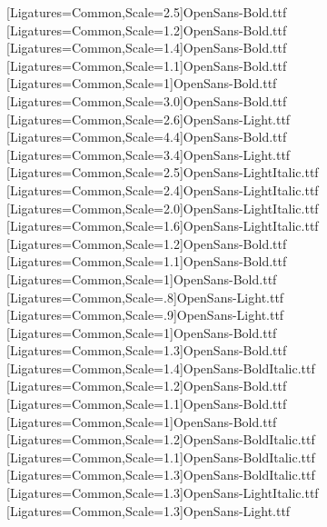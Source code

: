 \setsansfont[Ligatures=Common,Scale=1,SlantedFont={OpenSans-LightItalic.ttf},BoldFont={OpenSans-Bold.ttf},BoldSlantedFont={OpenSans-BoldItalic.ttf}]{OpenSans-Light.ttf} %
\newfontface{\sfbHugeRomeo}[Ligatures=Common,Scale=2.5]{OpenSans-Bold.ttf}
\newfontface{\cmssbxparttocRomeo}[Ligatures=Common,Scale=1.2]{OpenSans-Bold.ttf}
\newfontface{\cmssbxsectionRomeo}[Ligatures=Common,Scale=1.4]{OpenSans-Bold.ttf}
\newfontface{\cmssbxelevenRomeo}[Ligatures=Common,Scale=1.1]{OpenSans-Bold.ttf}
\newfontface{\cmssbxchaptocRomeo}[Ligatures=Common,Scale=1]{OpenSans-Bold.ttf}
\newfontface{\cmssbxchaptitleRomeo}[Ligatures=Common,Scale=3.0]{OpenSans-Bold.ttf}
\newfontface{\cmsschapnameRomeo}[Ligatures=Common,Scale=2.6]{OpenSans-Light.ttf}
\newfontface{\cmssbxpartRomeo}[Ligatures=Common,Scale=4.4]{OpenSans-Bold.ttf}
\newfontface{\cmssparttitleRomeo}[Ligatures=Common,Scale=3.4]{OpenSans-Light.ttf}
\newfontface{\sfiHugeRomeo}[Ligatures=Common,Scale=2.5]{OpenSans-LightItalic.ttf}
\newfontface{\sfititleRomeo}[Ligatures=Common,Scale=2.4]{OpenSans-LightItalic.ttf}
\newfontface{\sfihalftitleRomeo}[Ligatures=Common,Scale=2.0]{OpenSans-LightItalic.ttf}
\newfontface{\sfiauthorRomeo}[Ligatures=Common,Scale=1.6]{OpenSans-LightItalic.ttf}
\newfontface{\sfblargeRomeo}[Ligatures=Common,Scale=1.2]{OpenSans-Bold.ttf}
\newfontface{\sfbelevenRomeo}[Ligatures=Common,Scale=1.1]{OpenSans-Bold.ttf}
\newfontface{\sfbRomeo}[Ligatures=Common,Scale=1]{OpenSans-Bold.ttf}
\newfontface{\sfeightRomeo}[Ligatures=Common,Scale=.8]{OpenSans-Light.ttf}
\newfontface{\sfnineRomeo}[Ligatures=Common,Scale=.9]{OpenSans-Light.ttf}
[Ligatures=Common,Scale=1]{OpenSans-Bold.ttf}
\newfontface{\sfbsectionRomeo}[Ligatures=Common,Scale=1.3]{OpenSans-Bold.ttf}
\newfontface{\sfbsectionitalRomeo}[Ligatures=Common,Scale=1.4]{OpenSans-BoldItalic.ttf}
\newfontface{\sfbsubsecRomeo}[Ligatures=Common,Scale=1.2]{OpenSans-Bold.ttf}
\newfontface{\sfbsubsubRomeo}[Ligatures=Common,Scale=1.1]{OpenSans-Bold.ttf}
\newfontface{\sfbparaRomeo}[Ligatures=Common,Scale=1]{OpenSans-Bold.ttf}
\newfontface{\sfbsubsecitalRomeo}[Ligatures=Common,Scale=1.2]{OpenSans-BoldItalic.ttf}
\newfontface{\sfbsubsubsecitalRomeo}[Ligatures=Common,Scale=1.1]{OpenSans-BoldItalic.ttf}
\newfontface{\sfbiRHRomeo}[Ligatures=Common,Scale=1.3]{OpenSans-BoldItalic.ttf}
\newfontface{\sfiRHRomeo}[Ligatures=Common,Scale=1.3]{OpenSans-LightItalic.ttf}
\newfontface{\sfRHRomeo}[Ligatures=Common,Scale=1.3]{OpenSans-Light.ttf}

